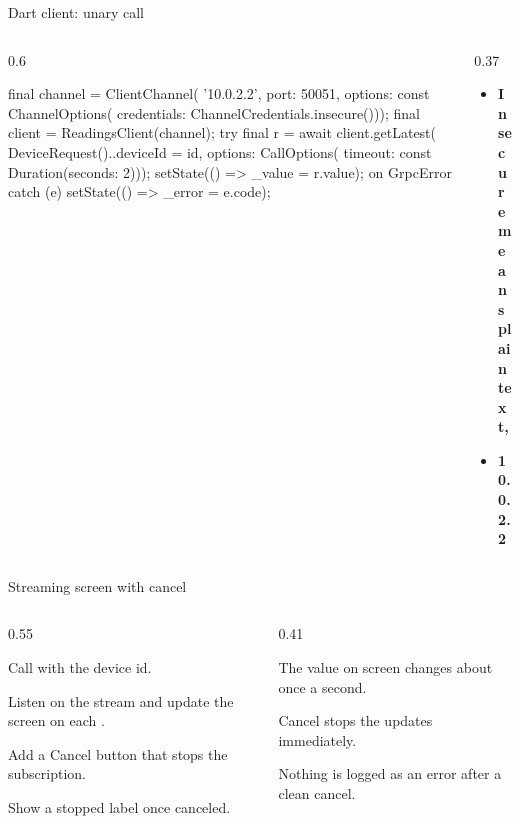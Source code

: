 \documentclass[10pt,aspectratio=169,t]{beamer}
\begin{document}
\begin{frame}[fragile,eyebrow=Task II]{Dart client: unary call}
  \begin{columns}[T]
    \begin{column}{0.6\textwidth}
\begin{dart}
final channel = ClientChannel(
    '10.0.2.2', port: 50051,
    options: const ChannelOptions(
        credentials:
            ChannelCredentials.insecure()));
final client = ReadingsClient(channel); try {
  final r = await client.getLatest(
    DeviceRequest()..deviceId = id,
    options: CallOptions(
        timeout: const Duration(seconds: 2)));
  setState(() => _value = r.value);
} on GrpcError catch (e) {
  setState(() => _error = e.code); }
\end{dart}
    \end{column}
    \begin{column}{0.37\textwidth}
      \begin{itemize}
        \item \textbf{Insecure means plaintext,} 
        \item \textbf{10.0.2.2} 
      \end{itemize}
    \end{column}
  \end{columns}
\end{frame}

\begin{frame}[fragile,eyebrow=Task III]{Streaming screen with cancel}
  \begin{columns}[T]
    \begin{column}{0.55\textwidth}
      \begin{steps}
        \item Call  with the device id.
        \item Listen on the stream and update the screen on each .
        \item Add a Cancel button that stops the subscription.
        \item Show a stopped label once canceled.
      \end{steps}
    \end{column}
    \begin{column}{0.41\textwidth}
      \begin{checklist}
        \item The value on screen changes about once a second.
        \item Cancel stops the updates immediately.
        \item Nothing is logged as an error after a clean cancel.
      \end{checklist}
    \end{column}
  \end{columns}
\end{frame}
\end{document}
